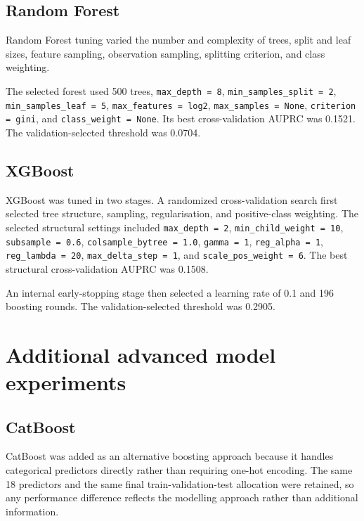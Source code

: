 \documentclass[11pt,a4paper]{article}
\begin{document}
\subsection{Random Forest}

Random Forest tuning varied the number and complexity of trees, split and leaf sizes, feature sampling, observation sampling, splitting criterion, and class weighting.

The selected forest used 500 trees, \texttt{max\_depth = 8}, \texttt{min\_samples\_split = 2}, \texttt{min\_samples\_leaf = 5}, \texttt{max\_features = log2}, \texttt{max\_samples = None}, \texttt{criterion = gini}, and \texttt{class\_weight = None}. Its best cross-validation AUPRC was 0.1521. The validation-selected threshold was 0.0704.

\subsection{XGBoost}

XGBoost was tuned in two stages. A randomized cross-validation search first selected tree structure, sampling, regularisation, and positive-class weighting. The selected structural settings included \texttt{max\_depth = 2}, \texttt{min\_child\_weight = 10}, \texttt{subsample = 0.6}, \texttt{colsample\_bytree = 1.0}, \texttt{gamma = 1}, \texttt{reg\_alpha = 1}, \texttt{reg\_lambda = 20}, \texttt{max\_delta\_step = 1}, and \texttt{scale\_pos\_weight = 6}. The best structural cross-validation AUPRC was 0.1508.

An internal early-stopping stage then selected a learning rate of 0.1 and 196 boosting rounds. The validation-selected threshold was 0.2905.

\section{Additional advanced model experiments}

\subsection{CatBoost}

CatBoost was added as an alternative boosting approach because it handles categorical predictors directly rather than requiring one-hot encoding. The same 18 predictors and the same final train-validation-test allocation were retained, so any performance difference reflects the modelling approach rather than additional information.
\end{document}
